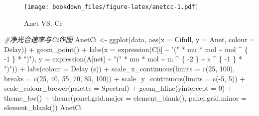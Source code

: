 \documentclass[
]{krantz}
\makeatletter
\newenvironment{Shaded}{\begin{snugshade}}{\end{snugshade}}
\newcommand{\AttributeTok}[1]{\textcolor[rgb]{0.77,0.63,0.00}{#1}}
\newcommand{\CommentTok}[1]{\textcolor[rgb]{0.56,0.35,0.01}{\textit{#1}}}
\newcommand{\DecValTok}[1]{\textcolor[rgb]{0.00,0.00,0.81}{#1}}
\newcommand{\FunctionTok}[1]{\textcolor[rgb]{0.00,0.00,0.00}{#1}}
\newcommand{\NormalTok}[1]{#1}
\newcommand{\OtherTok}[1]{\textcolor[rgb]{0.56,0.35,0.01}{#1}}
\newcommand{\SpecialCharTok}[1]{\textcolor[rgb]{0.00,0.00,0.00}{#1}}
\newcommand{\StringTok}[1]{\textcolor[rgb]{0.31,0.60,0.02}{#1}}
\newenvironment{kframe}{%
\medskip{}
\setlength{\fboxsep}{.8em}
 \def\at@end@of@kframe{}%
 \ifinner\ifhmode%
  \def\at@end@of@kframe{\end{minipage}}%
  \begin{minipage}{\columnwidth}%
 \fi\fi%
 \def\FrameCommand##1{\hskip\@totalleftmargin \hskip-\fboxsep
 \colorbox{shadecolor}{##1}\hskip-\fboxsep
     \hskip-\linewidth \hskip-\@totalleftmargin \hskip\columnwidth}%
 \MakeFramed {\advance\hsize-\width
   \@totalleftmargin\z@ \linewidth\hsize
   \@setminipage}}%
 {\par\unskip\endMakeFramed%
 \at@end@of@kframe}
\renewenvironment{Shaded}{\begin{kframe}}{\end{kframe}}
\makeatother
\begin{document}
\begin{figure}
\centering
\texttt{[image: bookdown\_files/figure-latex/anetcc-1.pdf]}
\caption{\label{fig:anetcc}Anet VS. Cc}
\end{figure}

\begin{Shaded}
\begin{Highlighting}[]
\CommentTok{\#净光合速率与Ci作图}
\NormalTok{AnetCi }\OtherTok{\textless{}{-}} \FunctionTok{ggplot}\NormalTok{(data, }\FunctionTok{aes}\NormalTok{(}\AttributeTok{x =}\NormalTok{ Cifull, }\AttributeTok{y =}\NormalTok{ Anet, }\AttributeTok{colour =}\NormalTok{ Delay)) }\SpecialCharTok{+}
  \FunctionTok{geom\_point}\NormalTok{() }\SpecialCharTok{+}
  \FunctionTok{labs}\NormalTok{(}\AttributeTok{x =} \FunctionTok{expression}\NormalTok{(C[i] }\SpecialCharTok{\textasciitilde{}} \StringTok{"("} \SpecialCharTok{*}\NormalTok{ mu }\SpecialCharTok{*}\NormalTok{ mol }\SpecialCharTok{\textasciitilde{}}\NormalTok{ mol }\SpecialCharTok{\^{}}\NormalTok{ \{}
    \SpecialCharTok{{-}}\DecValTok{1}
\NormalTok{  \} }\SpecialCharTok{*} \StringTok{")"}\NormalTok{),}
  \AttributeTok{y =} \FunctionTok{expression}\NormalTok{(A[net] }\SpecialCharTok{\textasciitilde{}} \StringTok{"("} \SpecialCharTok{*}\NormalTok{ mu }\SpecialCharTok{*}\NormalTok{ mol }\SpecialCharTok{\textasciitilde{}}\NormalTok{ m }\SpecialCharTok{\^{}}\NormalTok{ \{}
    \SpecialCharTok{{-}}\DecValTok{2}
\NormalTok{  \} }\SpecialCharTok{\textasciitilde{}}\NormalTok{ s }\SpecialCharTok{\^{}}\NormalTok{ \{}
    \SpecialCharTok{{-}}\DecValTok{1}
\NormalTok{  \} }\SpecialCharTok{*} \StringTok{")"}\NormalTok{)) }\SpecialCharTok{+}
  \FunctionTok{labs}\NormalTok{(}\AttributeTok{colour =} \StringTok{\textquotesingle{}Delay (s)\textquotesingle{}}\NormalTok{) }\SpecialCharTok{+}
  \FunctionTok{scale\_x\_continuous}\NormalTok{(}\AttributeTok{limits =} \FunctionTok{c}\NormalTok{(}\DecValTok{25}\NormalTok{, }\DecValTok{100}\NormalTok{),}
                     \AttributeTok{breaks =} \FunctionTok{c}\NormalTok{(}\DecValTok{25}\NormalTok{, }\DecValTok{40}\NormalTok{, }\DecValTok{55}\NormalTok{, }\DecValTok{70}\NormalTok{, }\DecValTok{85}\NormalTok{, }\DecValTok{100}\NormalTok{)) }\SpecialCharTok{+}
  \FunctionTok{scale\_y\_continuous}\NormalTok{(}\AttributeTok{limits =} \FunctionTok{c}\NormalTok{(}\SpecialCharTok{{-}}\DecValTok{5}\NormalTok{, }\DecValTok{5}\NormalTok{)) }\SpecialCharTok{+}
  \FunctionTok{scale\_colour\_brewer}\NormalTok{(}\AttributeTok{palette =} \StringTok{\textquotesingle{}Spectral\textquotesingle{}}\NormalTok{) }\SpecialCharTok{+}
  \FunctionTok{geom\_hline}\NormalTok{(}\AttributeTok{yintercept =} \DecValTok{0}\NormalTok{) }\SpecialCharTok{+}
  \FunctionTok{theme\_bw}\NormalTok{() }\SpecialCharTok{+}
  \FunctionTok{theme}\NormalTok{(}\AttributeTok{panel.grid.major =} \FunctionTok{element\_blank}\NormalTok{(),}
        \AttributeTok{panel.grid.minor =} \FunctionTok{element\_blank}\NormalTok{())}
\NormalTok{AnetCi}
\end{Highlighting}
\end{Shaded}
\end{document}
